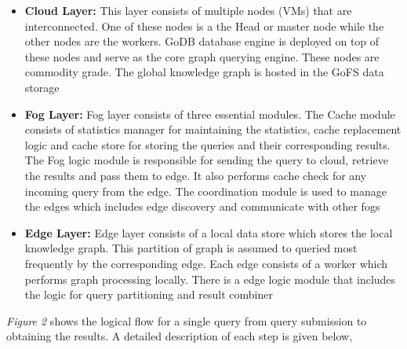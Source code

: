 \documentclass[conference]{IEEEtran}
\begin{document}
\begin{itemize}%
	\item \textbf{Cloud Layer:} This layer consists of multiple nodes (VMs) that are interconnected. One of these nodes is a the Head or master node while the other nodes are the workers. GoDB database engine is deployed on top of these nodes and serve as the core graph querying engine. These nodes are commodity grade. The global knowledge graph is hosted in the GoFS data storage
	\item \textbf{Fog Layer: } Fog layer consists of three essential modules. The Cache module consists of statistics manager for maintaining the statistics, cache replacement logic and cache store for storing the queries and their corresponding results. The Fog logic module is responsible for sending the query to cloud, retrieve the results and pass them to edge. It also performs cache check for any incoming query from the edge. The coordination module is used to manage the edges which includes edge discovery and communicate with other fogs
	\item \textbf{Edge Layer: }	Edge layer consists of a local data store which stores the local knowledge graph. This partition of graph is assumed to queried most frequently by the corresponding edge. Each edge consists of a worker which performs graph processing locally. There is a edge logic module that includes the logic for query partitioning and result combiner 
\end{itemize}

\emph{Figure 2} shows the logical flow for a single query from query submission to obtaining the results. A detailed description of each step is given below,
\end{document}
